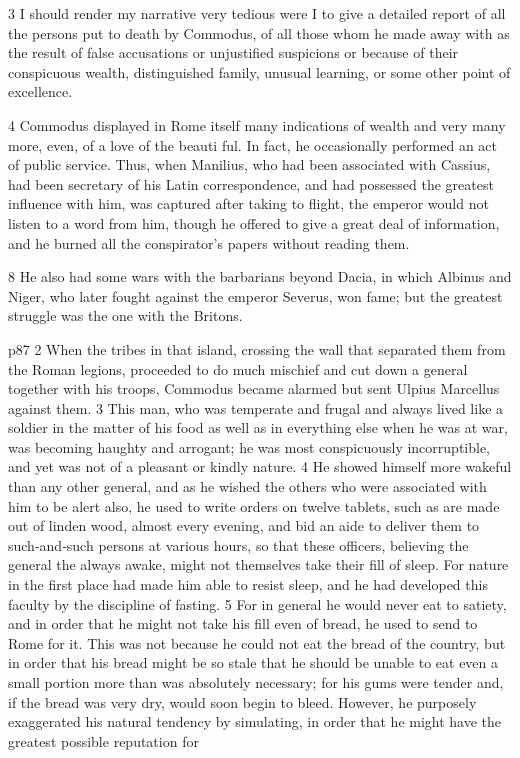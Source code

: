 3
I should render my narrative very tedious were I to give a detailed report of all the persons put to death by Commodus, of all those whom he made away with as the result of false accusations or unjustified suspicions or because of their conspicuous wealth, distinguished family, unusual learning, or some other point of excellence.

4
Commodus displayed in Rome itself many indications of wealth and very many more, even, of a love of the beauti ­ful. In fact, he occasionally performed an act of public service. Thus, when Manilius, who had been associated with Cassius, had been secretary of his Latin correspondence, and had possessed the greatest influence with him, was captured after taking to flight, the emperor would not listen to a word from him, though he offered to give a great deal of information, and he burned all the conspirator's papers without reading them.

8
He also had some wars with the barbarians beyond Dacia, in which Albinus and Niger, who later fought against the emperor Severus, won fame; but the greatest struggle was the one with the Britons.

p87 2 When the tribes in that island, crossing the wall that separated them from the Roman legions, proceeded to do much mischief and cut down a general together with his troops, Commodus became alarmed but sent Ulpius Marcellus against them. 3 This man, who was temperate and frugal and always lived like a soldier in the matter of his food as well as in everything else when he was at war, was becoming haughty and arrogant; he was most conspicuously incorruptible, and yet was not of a pleasant or kindly nature. 4 He showed himself more wakeful than any other general, and as he wished the others who were associated with him to be alert also, he used to write orders on twelve tablets, such as are made out of linden wood, almost every evening, and bid an aide to deliver them to such-and\texthebrew{‑}such persons at various hours, so that these officers, believing the general the always awake, might not themselves take their fill of sleep. For nature in the first place had made him able to resist sleep, and he had developed this faculty by the discipline of fasting. 5 For in general he would never eat to satiety, and in order that he might not take his fill even of bread, he used to send to Rome for it. This was not because he could not eat the bread of the country, but in order that his bread might be so stale that he should be unable to eat even a small portion more than was absolutely necessary; for his gums were tender and, if the bread was very dry, would soon begin to bleed. However, he purposely exaggerated his natural tendency by simulating, in order that he might have the greatest possible reputation for

